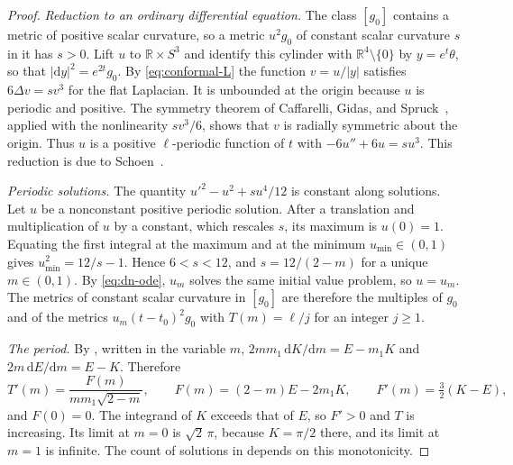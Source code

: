 \documentclass[11pt]{article}
\numberwithin{equation}{section}
\newcommand{\dd}{\mathrm{d}}
\newcommand{\RR}{\mathbb{R}}
\newcommand{\abs}[1]{\lvert #1\rvert}
\begin{document}
\begin{proof}
\emph{Reduction to an ordinary differential equation.}
The class \([g_0]\) contains a metric of positive scalar curvature, so
a metric \(u^2g_0\) of constant scalar curvature \(s\) in it has
\(s>0\). Lift \(u\) to \(\RR\times S^3\) and identify this cylinder
with \(\RR^4\setminus\{0\}\) by \(y=e^t\theta\), so that
\(\abs{\dd y}^2=e^{2t}g_0\). By \eqref{eq:conformal-L} the function
\(v=u/\abs y\) satisfies \(6\Delta v=sv^3\) for the flat Laplacian.
It is unbounded at the origin because \(u\) is periodic and positive.
The symmetry theorem of Caffarelli, Gidas, and
Spruck~\cite[Theorem~8.1]{CaffarelliGidasSpruck1989}, applied with the
nonlinearity \(sv^3/6\), shows that \(v\) is radially symmetric about
the origin. Thus \(u\) is a positive \(\ell\)-periodic function of
\(t\) with \(-6u''+6u=su^3\). This reduction is due to
Schoen~\cite[\S2]{Schoen1989Variational}.

\emph{Periodic solutions.}
The quantity \(u'^2-u^2+su^4/12\) is constant along solutions. Let
\(u\) be a nonconstant positive periodic solution. After a translation
and multiplication of \(u\) by a constant, which rescales \(s\), its
maximum is \(u(0)=1\). Equating the first integral at the maximum and
at the minimum \(u_{\min}\in(0,1)\) gives \(u_{\min}^2=12/s-1\). Hence
\(6<s<12\), and \(s=12/(2-m)\) for a unique \(m\in(0,1)\). By
\eqref{eq:dn-ode}, \(u_m\) solves the same initial value problem, so
\(u=u_m\). The metrics of constant scalar curvature in \([g_0]\) are
therefore the multiples of \(g_0\) and of the metrics
\(u_m(t-t_0)^2g_0\) with \(T(m)=\ell/j\) for an integer \(j\ge1\).

\emph{The period.}
By \cite[(19.4.1), (19.4.2)]{DLMF}, written in the variable \(m\),
\(2mm_1\,\dd K/\dd m=E-m_1K\) and \(2m\,\dd E/\dd m=E-K\). Therefore
\[
 T'(m)=\frac{F(m)}{mm_1\sqrt{2-m}},\qquad
 F(m)=(2-m)E-2m_1K,\qquad F'(m)=\tfrac32(K-E),
\]
and \(F(0)=0\). The integrand of \(K\) exceeds that of \(E\), so
\(F'>0\) and \(T\) is increasing. Its limit at \(m=0\) is
\(\sqrt2\,\pi\), because \(K=\pi/2\) there, and its limit at \(m=1\)
is infinite. The count of solutions in
\cite[\S2]{Schoen1989Variational} depends on this monotonicity.


\end{proof}
\end{document}

